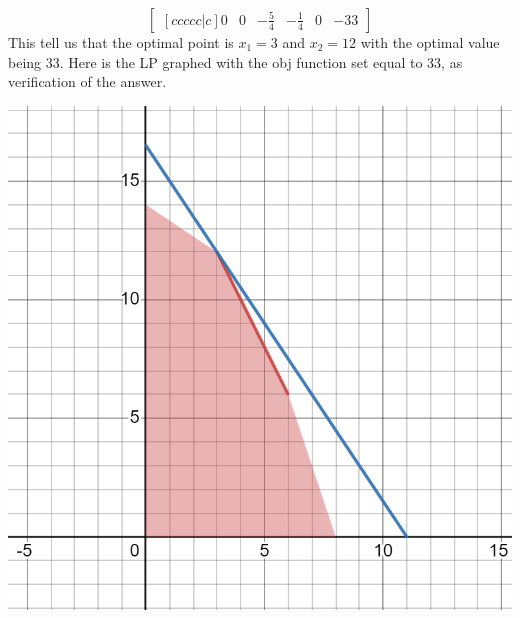 \documentclass[12pt]{article}
\newenvironment{exercise}[2][Exercise]{\begin{trivlist}
		\item[\hskip \labelsep {\bfseries #1}\hskip \labelsep {\bfseries #2.}]}{\end{trivlist}}
\begin{document}
\begin{exercise}{1}
\[\begin{bmatrix}[ccccc|c]
		0 & 0 & -\frac{5}{4} & -\frac{1}{4} & 0 & -33
	\end{bmatrix}\]
	This tell us that the optimal point is $x_1=3$ and $x_2=12$ with the optimal value being $33$.
	Here is the LP graphed with the obj function set equal to 33, as verification of the answer.
	\begin{center}\includegraphics[scale=0.25]{desmos-graph}\end{center}
	\end{exercise}
	
\end{document}
